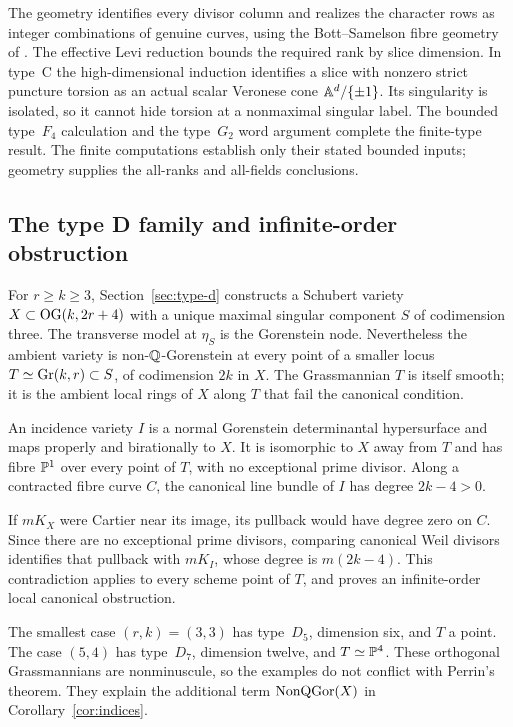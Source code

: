 The geometry identifies every divisor column and realizes the character rows as integer combinations of genuine curves, using the Bott--Samelson fibre geometry of \cite{Ha04}. The effective Levi reduction bounds the required rank by slice dimension. In type~C the high-dimensional induction identifies a slice with nonzero strict puncture torsion as an actual scalar Veronese cone $\mathbb A^d/\{\pm1\}$. Its singularity is isolated, so it cannot hide torsion at a nonmaximal singular label. The bounded type~$F_4$ calculation and the type~$G_2$ word argument complete the finite-type result. The finite computations establish only their stated bounded inputs; geometry supplies the all-ranks and all-fields conclusions.

\subsection{The type D family and infinite-order obstruction}
For $r\ge k\ge3$, Section~\ref{sec:type-d} constructs a Schubert variety $X\subset\operatorname{OG}(k,2r+4)$ with a unique maximal singular component $S$ of codimension three. The transverse model at $\eta_S$ is the Gorenstein node. Nevertheless the ambient variety is non-$\mathbb Q$-Gorenstein at every point of a smaller locus $T\simeq\operatorname{Gr}(k,r)\subset S$, of codimension $2k$ in $X$. The Grassmannian $T$ is itself smooth; it is the ambient local rings of $X$ along $T$ that fail the canonical condition.

An incidence variety $I$ is a normal Gorenstein determinantal hypersurface and maps properly and birationally to $X$. It is isomorphic to $X$ away from $T$ and has fibre $\mathbb P^1$ over every point of $T$, with no exceptional prime divisor. Along a contracted fibre curve $C$, the canonical line bundle of $I$ has degree $2k-4>0$.

If $mK_X$ were Cartier near its image, its pullback would have degree zero on $C$. Since there are no exceptional prime divisors, comparing canonical Weil divisors identifies that pullback with $mK_I$, whose degree is $m(2k-4)$. This contradiction applies to every scheme point of $T$, and proves an infinite-order local canonical obstruction.

The smallest case $(r,k)=(3,3)$ has type~$D_5$, dimension six, and $T$ a point. The case $(5,4)$ has type~$D_7$, dimension twelve, and $T\simeq\mathbb P^4$. These orthogonal Grassmannians are nonminuscule, so the examples do not conflict with Perrin's theorem. They explain the additional term $\operatorname{NonQGor}(X)$ in Corollary~\ref{cor:indices}.

